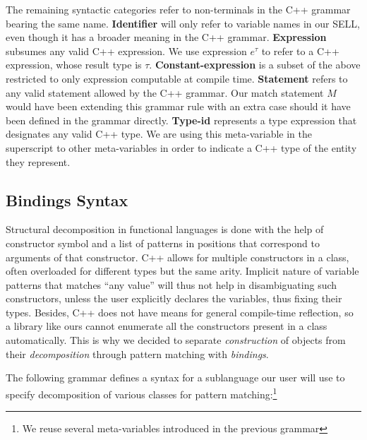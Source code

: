 \documentclass[preprint]{sigplanconf}
\begin{document}
The remaining syntactic categories refer to non-terminals in the C++ grammar 
bearing the same name. {\bf Identifier} will only refer to variable names in our 
SELL, even though it has a broader meaning in the C++ grammar. {\bf Expression}
subsumes any valid C++ expression. We use expression $e^\tau$ to refer to a C++ 
expression, whose result type is $\tau$. {\bf Constant-expression} is a subset 
of the above restricted to only expression computable at compile time. {\bf 
Statement} refers to any valid statement allowed by the C++ grammar. Our match 
statement $M$ would have been extending this grammar rule with an extra case 
should it have been defined in the grammar directly. {\bf Type-id} represents a 
type expression that designates any valid C++ type. We are using this 
meta-variable in the superscript to other meta-variables in order to indicate a 
C++ type of the entity they represent.

\subsection{Bindings Syntax}
\label{sec:bnd}

Structural decomposition in functional languages is done with the help of 
constructor symbol and a list of patterns in positions that correspond to 
arguments of that constructor. C++ allows for multiple constructors in a class, 
often overloaded for different types but the same arity. Implicit nature of 
variable patterns that matches ``any value'' will thus not help in 
disambiguating such constructors, unless the user explicitly declares the 
variables, thus fixing their types. Besides, C++ does not have means for 
general compile-time reflection, so a library like ours cannot enumerate 
all the constructors present in a class automatically. This is why we decided to 
separate \emph{construction} of objects from their \emph{decomposition} through 
pattern matching with \emph{bindings}.


The following grammar defines a syntax for a sublanguage our user will use to 
specify decomposition of various classes for pattern matching:\footnote{We reuse 
several meta-variables introduced in the previous grammar}
\end{document}
